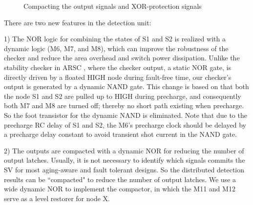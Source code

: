 \begin{figure}[t]
\centering {}
\hspace{1cm}   \caption{Compacting the
output signals and XOR-protection signals} \label{compactor}
\end{figure}


There are two new features in the detection unit:

1) The NOR logic for combining the states of S1 and S2 is realized with a dynamic
logic (M6, M7, and M8), which can improve the robustness of the checker and reduce
the area overhead and switch power dissipation. Unlike the stability checker in ARSC
\cite{agarwal2007circuit}, where the checker output, a static NOR gate, is
directly driven by a floated HIGH node during fault-free time, our checker's output
is generated by a dynamic NAND gate. This change is based on that both the node S1
and S2 are pulled up to HIGH during precharge, and consequently both M7 and M8 are
turned off; thereby no short path existing when precharge. So the foot transistor
for the dynamic NAND is eliminated. Note that due to the precharge RC delay of S1
and S2, the M6's precharge clock should be delayed by a precharge delay constant to
avoid transient shot current in the NAND gate.

2) The outputs are compacted with a dynamic NOR for reducing the number of output
latches. Usually, it is not necessary to identify which signals commits the SV for
most aging-aware and fault tolerant designs. So the distributed detection results
can be ``compacted" to reduce the number of output latches. We use a wide dynamic
NOR to implement the compactor, in which the M11 and M12 serve as a level restorer
for node X.




